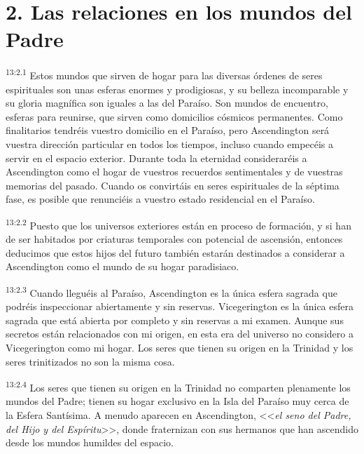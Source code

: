 \section*{2. Las relaciones en los mundos del Padre}
\par
\textsuperscript{13:2.1} Estos mundos que sirven de hogar para las diversas órdenes de seres espirituales son unas esferas enormes y prodigiosas, y su belleza incomparable y su gloria magnífica son iguales a las del Paraíso. Son mundos de encuentro, esferas para reunirse, que sirven como domicilios cósmicos permanentes. Como finalitarios tendréis vuestro domicilio en el Paraíso, pero Ascendington será vuestra dirección particular en todos los tiempos, incluso cuando empecéis a servir en el espacio exterior. Durante toda la eternidad consideraréis a Ascendington como el hogar de vuestros recuerdos sentimentales y de vuestras memorias del pasado. Cuando os convirtáis en seres espirituales de la séptima fase, es posible que renunciéis a vuestro estado residencial en el Paraíso.

\par
\textsuperscript{13:2.2} Puesto que los universos exteriores están en proceso de formación, y si han de ser habitados por criaturas temporales con potencial de ascensión, entonces deducimos que estos hijos del futuro también estarán destinados a considerar a Ascendington como el mundo de su hogar paradisiaco.

\par
\textsuperscript{13:2.3} Cuando lleguéis al Paraíso, Ascendington es la única esfera sagrada que podréis inspeccionar abiertamente y sin reservas. Vicegerington es la única esfera sagrada que está abierta por completo y sin reservas a mi examen. Aunque sus secretos están relacionados con mi origen, en esta era del universo no considero a Vicegerington como mi hogar. Los seres que tienen su origen en la Trinidad y los seres trinitizados no son la misma cosa.

\par
\textsuperscript{13:2.4} Los seres que tienen su origen en la Trinidad no comparten plenamente los mundos del Padre; tienen su hogar exclusivo en la Isla del Paraíso muy cerca de la Esfera Santísima. A menudo aparecen en Ascendington, <<\textit{el seno del Padre, del Hijo y del Espíritu}>>, donde fraternizan con sus hermanos que han ascendido desde los mundos humildes del espacio.

